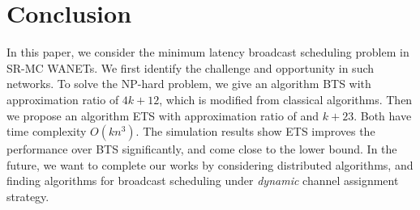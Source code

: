 \documentclass[10pt, conference]{IEEEtran}
\begin{document}
\fi









\iffalse
In our simulations, we compare our BTS and ETS algorithms with
a modified existing greedy algorithm (GA) proposed by \cite{ICDCN10,
MR-MC}. The greedy algorithm first constructs a BFS tree. After
that, GA runs in layers and selects a tx instance (including node and channel)
$(u,c)$ which covers the maximum number of uncovered nodes in
each layer. GA also calculates the rank of each node. For a
node, a high rank means it is responsible for relaying packets
further.
\fi


















\section{Conclusion} \label{con}
In this paper, we consider the minimum latency broadcast
scheduling problem in SR-MC WANETs. We first identify the
challenge and opportunity in such networks. To solve the
NP-hard problem, we give an algorithm BTS with approximation
ratio of $4k + 12$, which is modified from classical
algorithms. Then we propose an algorithm ETS with approximation
ratio of and $k+23$. Both have time complexity $O(k n^3)$. The
simulation results show ETS improves the performance over BTS
significantly, and come close to the lower bound. In the
future, we want to complete our works by considering
distributed algorithms, and finding algorithms for broadcast
scheduling under \emph{dynamic} channel assignment strategy.




\iffalse
\section{Future Work}
The future work includes:
\begin{itemize}
  \item Distributed Algorithms and Performance Bound.
  \item Channel-Hopping Based Algorithms.
\end{itemize}
\fi
\end{document}
